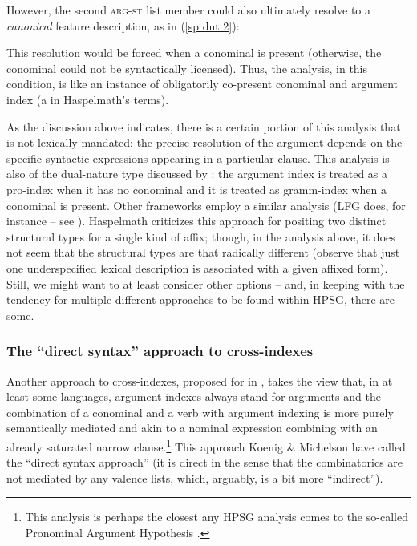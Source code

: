 \documentclass[output=paper
	        ,collection
	        ,collectionchapter
 	        ,biblatex
                ,babelshorthands
                ,newtxmath
                ,draftmode
                ,colorlinks, citecolor=brown
]{langscibook}
\begin{document}
However, the second \textsc{arg-st} list member could also ultimately resolve to a \textit{canonical} feature description, as in (\ref{sp dut 2}):   
%
%
\begin{exe}
\ex\label{sp dut 2}
\end{exe}
%
This resolution would be forced when a conominal is present (otherwise, the conominal could not be syntactically licensed). Thus, the analysis, in this condition, is like an instance of obligatorily co-present conominal and argument index (a  in Haspelmath's terms). 

As the discussion above indicates, there is a certain portion of this analysis that is not lexically mandated: the precise resolution of the argument depends on the specific syntactic expressions appearing in a particular clause. This analysis is also of the dual-nature type discussed by \citet{haspelmath13}: the argument index is treated as a pro-index when it has no conominal and it is treated as gramm-index when a conominal is present. Other frameworks employ a similar analysis (LFG  does, for instance -- see \citealt[Chapter 8]{BATW2015a}). Haspelmath criticizes this approach for positing two distinct structural types for a single kind of affix; though, in the analysis above, it does not seem that the structural types are that radically different (observe that just one underspecified lexical description is associated with a given affixed form). Still, we might want to at least consider other options -- and, in keeping with the tendency for multiple different approaches to be found within HPSG, there are some.  

\subsubsection{The ``direct syntax'' approach to cross-indexes}

Another approach to cross-indexes, proposed for  in \citet{KM15}, takes the view that, in at least some languages, argument indexes always stand for arguments and the combination of a conominal and a verb with argument indexing is more purely semantically mediated and akin to a nominal expression combining with an already saturated narrow clause.\footnote{This analysis is perhaps the closest any HPSG analysis comes to the so-called Pronominal Argument Hypothesis \citep{jelinek84}.} This approach Koenig \& Michelson have called the ``direct syntax approach'' (it is direct in the sense that the combinatorics are not mediated by any valence lists, which, arguably, is a bit more ``indirect''). 
\end{document}
